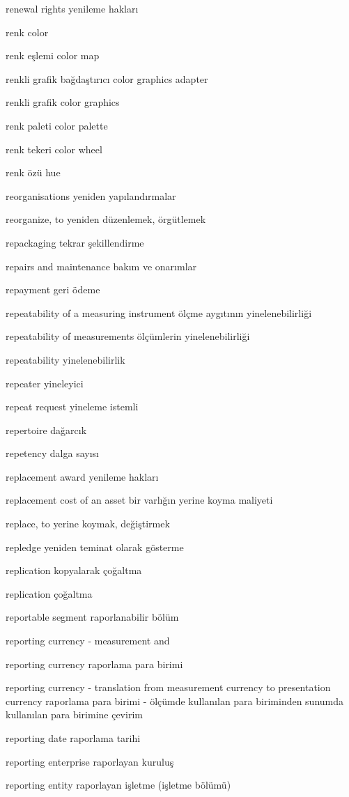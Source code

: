 \documentclass[12pt,fleqn]{article}\usepackage{../../common}
\begin{document}
renewal rights yenileme hakları

renk color

renk eşlemi color map

renkli grafik bağdaştırıcı color graphics adapter

renkli grafik color graphics

renk paleti color palette

renk tekeri color wheel

renk özü hue

reorganisations yeniden yapılandırmalar

reorganize, to yeniden düzenlemek, örgütlemek

repackaging tekrar şekillendirme

repairs and maintenance bakım ve onarımlar

repayment geri ödeme

repeatability of a measuring instrument ölçme aygıtının yinelenebilirliği

repeatability of measurements ölçümlerin yinelenebilirliği

repeatability yinelenebilirlik

repeater yineleyici

repeat request yineleme istemli

repertoire dağarcık

repetency dalga sayısı

replacement award yenileme hakları

replacement cost of an asset bir varlığın yerine koyma maliyeti

replace, to yerine koymak, değiştirmek

repledge yeniden teminat olarak gösterme

replication kopyalarak çoğaltma

replication çoğaltma

reportable segment raporlanabilir bölüm

reporting currency - measurement and

reporting currency raporlama para birimi

reporting currency - translation from measurement currency to presentation currency raporlama para birimi - ölçümde kullanılan para biriminden sunumda kullanılan para birimine çevirim

reporting date raporlama tarihi

reporting enterprise raporlayan kuruluş

reporting entity raporlayan işletme (işletme bölümü)
\end{document}
